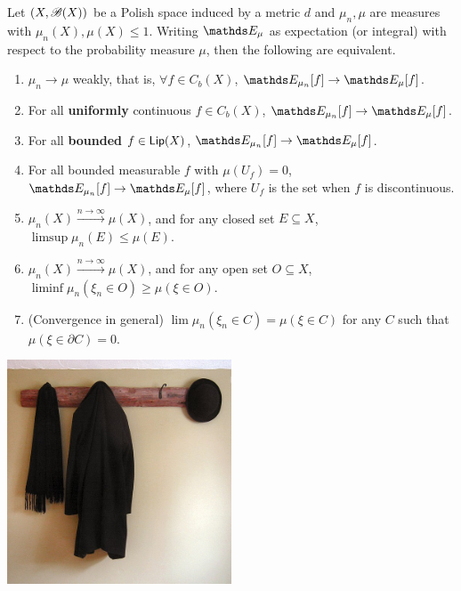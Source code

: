\begin{theorem} \label{def:conv_in_dist}
Let $(X,\mathcal{B}(X))$ be a Polish space induced by a metric $d$ and $\mu_n, \mu$ are measures with $\mu_n(X), \mu(X) \leq 1$. Writing $\E_\mu$ as expectation (or integral) with respect to the probability measure $\mu$, then the following are equivalent.
\begin{enumerate}
    \item $\mu_n \to \mu$ weakly, that is, $\forall f \in C_b(X)$, $\E_{\mu_n}[f] \to \E_\mu[f]$.
    \item For all \textbf{uniformly} continuous $f \in C_b(X)$, $\E_{\mu_n}[f] \to \E_\mu[f]$.
    \item For all \textbf{bounded} $f \in \mathsf{Lip}(X)$, $\E_{\mu_n}[f] \to \E_\mu[f]$.
    \item For all bounded measurable $f$ with $\mu(U_f) = 0$, $\E_{\mu_n}[f] \to \E_\mu[f]$, where $U_f$ is the set when $f$ is discontinuous.
    \item $\mu_n(X) \overset{n\to\infty}{\to} \mu(X)$, and for any closed set $E \subseteq X$, $\limsup \mu_n(E) \leq \mu(E)$.
    \item $\mu_n(X) \overset{n\to\infty}{\to} \mu(X)$, and for any open set $O \subseteq X$, $\liminf \mu_n(\xi_n \in O) \ge \mu(\xi \in O)$.
    \item (Convergence in general) $\lim \mu_n (\xi_n \in C) = \mu(\xi \in C)$ for any $C$ such that $\mu(\xi \in \partial C) = 0$.
\end{enumerate}
\end{theorem}

\begin{center}
\includegraphics[width=0.5\textwidth]{figures/hanger.jpg}
\end{center}

